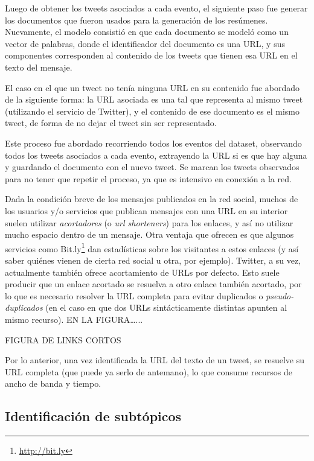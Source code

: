     Luego de obtener los tweets asociados a cada evento, el siguiente
    paso fue generar los documentos que fueron usados para la
    generación de los resúmenes. Nuevamente, el modelo consistió en que cada
    documento se modeló como un vector de palabras, donde el
    identificador del documento es una URL, y sus componentes
    corresponden al contenido de los tweets que tienen esa URL en el
    texto del mensaje.

    El caso en el que un tweet no tenía ninguna URL en su contenido
    fue abordado de la siguiente forma: la URL asociada es una tal que
    representa al mismo tweet (utilizando el servicio de Twitter), y
    el contenido de ese documento es el mismo tweet, de forma de no
    dejar el tweet sin ser representado.

    Este proceso fue abordado recorriendo todos los eventos del
    dataset, observando todos los tweets asociados a cada evento,
    extrayendo la URL si es que hay alguna y guardando el documento
    con el nuevo tweet. Se marcan los tweets observados para no tener
    que repetir el proceso, ya que es intensivo en conexión a la red.

    Dada la condición breve de los mensajes publicados en la red
    social, muchos de los usuarios y/o servicios que publican mensajes
    con una URL en su interior suelen utilizar \emph{acortadores}
    (o \emph{url shorteners}) para los enlaces, y así no utilizar mucho
    espacio dentro de un
    mensaje. Otra ventaja que ofrecen es que algunos servicios como
    Bit.ly\footnote{\href{http://bit.ly}{http://bit.ly} } dan estadísticas sobre los visitantes a
    estos enlaces (y así saber quiénes vienen de cierta red social u
    otra, por ejemplo). Twitter, a su vez, actualmente también ofrece
    acortamiento de URLs por defecto. Esto suele producir que un enlace
    acortado se resuelva a otro enlace también acortado, por lo que es
    necesario resolver la URL completa para evitar duplicados o
    \emph{pseudo-duplicados} (en el caso en que dos URLs sintácticamente
    distintas apunten al mismo recurso). EN LA FIGURA\ldots{}...

    FIGURA DE LINKS CORTOS

    Por lo anterior, una vez identificada la URL del texto de un
    tweet, se resuelve su URL completa (que puede ya serlo de
    antemano), lo que consume recursos de ancho de banda y
    tiempo.

\subsection{Identificación de subtópicos}
\label{sec-4.2.2}


